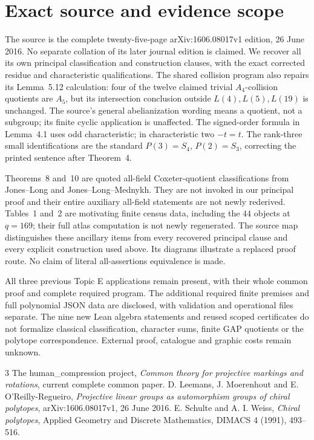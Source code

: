\documentclass[11pt,a4paper]{article}
\begin{document}
\section{Exact source and evidence scope}
The source is the complete twenty-five-page arXiv:1606.08017v1 edition,
26 June 2016. No separate collation of its later journal edition is
claimed. We recover all its own principal classification and construction
clauses, with the exact corrected residue and characteristic qualifications.
The shared collision program also repairs its Lemma~5.12 calculation:
four of the twelve claimed trivial $A_4$-collision quotients are $A_5$,
but its intersection conclusion outside $L(4),L(5),L(19)$ is unchanged.
The source's general abelianization wording means a quotient, not a
subgroup; its finite cyclic application is unaffected. The signed-order
formula in Lemma~4.1 uses odd characteristic; in characteristic two
$-t=t$. The rank-three small identifications are the standard
$P(3)=S_4$, $P(2)=S_3$, correcting the printed sentence after Theorem~4.

Theorems~8 and~10 are quoted all-field Coxeter-quotient classifications
from Jones--Long and Jones--Long--Mednykh. They are not invoked in our
principal proof and their entire auxiliary all-field statements are not
newly rederived. Tables~1 and~2 are motivating finite census data,
including the $44$ objects at $q=169$; their full atlas computation is
not newly regenerated. The source map distinguishes these ancillary
items from every recovered principal clause and every explicit
construction used above. Its diagrams illustrate a replaced proof route.
No claim of literal all-assertions equivalence is made.

All three previous Topic E applications remain present, with their whole
common proof and complete required program. The additional required
finite premises and full polynomial JSON data are disclosed, with
validation and operational files separate. The nine new Lean algebra
statements and reused scoped certificates do not formalize classical
classification, character sums, finite GAP quotients or the polytope
correspondence. External proof, catalogue and graphic costs remain unknown.

\begin{thebibliography}{3}
 The human\_compression project,
\emph{Common theory for projective markings and rotations}, current complete common paper.
 D. Leemans, J. Moerenhout and E. O'Reilly-Regueiro,
\emph{Projective linear groups as automorphism groups of chiral polytopes},
arXiv:1606.08017v1, 26 June 2016.
 E. Schulte and A. I. Weiss, \emph{Chiral polytopes},
Applied Geometry and Discrete Mathematics, DIMACS 4 (1991), 493--516.
\end{thebibliography}
\end{document}

